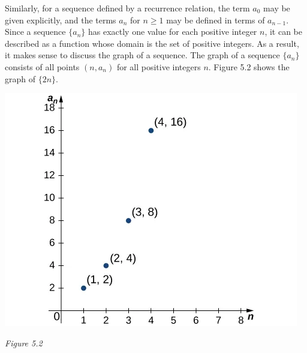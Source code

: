 \documentclass{report}
\begin{document}
    \bigbreak \noindent 
    \bigbreak \noindent 
    \begin{minipage}[t]{0.52\textwidth}
        Similarly, for a sequence defined by a recurrence relation, the term $a_0$ may be given explicitly, and the terms $a_n$ for $n \geq 1$ may be defined in terms of $a_{n-1}$. Since a sequence $\{a_n\}$ has exactly one value for each positive integer $n$, it can be described as a function whose domain is the set of positive integers. As a result, it makes sense to discuss the graph of a sequence. The graph of a sequence $\{a_n\}$ consists of all points $(n, a_n)$ for all positive integers $n$. Figure 5.2 shows the graph of $\{2n\}$.
    \end{minipage}
    \begin{minipage}[t]{0.47\textwidth}
         \begin{center}
            \includegraphics[scale=0.5]{./figures/mane6.png}
        \end{center}
        \begin{center}
            \textit{Figure 5.2}
        \end{center}
    \end{minipage}
    \bigbreak \noindent 

    





    
\end{document}
